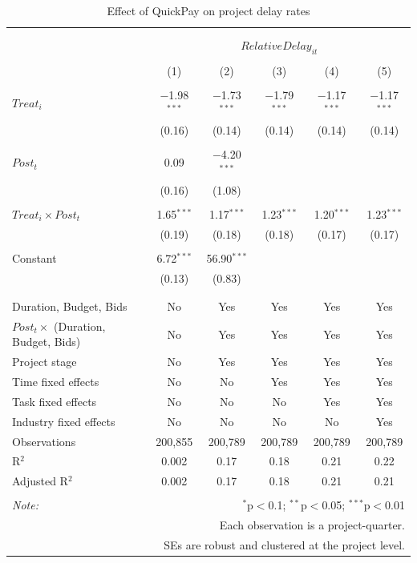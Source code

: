 \documentclass[
]{article}
\begin{document}
\begin{table}[H] \centering 
  \caption{Effect of QuickPay on project delay rates} 
  \label{} 
\small 
\begin{tabular}{@{\extracolsep{-2pt}}lccccc} 
\\[-1.8ex]\hline 
\hline \\[-1.8ex] 
\\[-1.8ex] & \multicolumn{5}{c}{$RelativeDelay_{it}$} \\ 
\\[-1.8ex] & (1) & (2) & (3) & (4) & (5)\\ 
\hline \\[-1.8ex] 
 $Treat_i$ & $-$1.98$^{***}$ & $-$1.73$^{***}$ & $-$1.79$^{***}$ & $-$1.17$^{***}$ & $-$1.17$^{***}$ \\ 
  & (0.16) & (0.14) & (0.14) & (0.14) & (0.14) \\ 
  & & & & & \\ 
 $Post_t$ & 0.09 & $-$4.20$^{***}$ &  &  &  \\ 
  & (0.16) & (1.08) &  &  &  \\ 
  & & & & & \\ 
 $Treat_i \times Post_t$ & 1.65$^{***}$ & 1.17$^{***}$ & 1.23$^{***}$ & 1.20$^{***}$ & 1.23$^{***}$ \\ 
  & (0.19) & (0.18) & (0.18) & (0.17) & (0.17) \\ 
  & & & & & \\ 
 Constant & 6.72$^{***}$ & 56.90$^{***}$ &  &  &  \\ 
  & (0.13) & (0.83) &  &  &  \\ 
  & & & & & \\ 
\hline \\[-1.8ex] 
Duration, Budget, Bids & No & Yes & Yes & Yes & Yes \\ 
$Post_t \times$  (Duration, Budget, Bids) & No & Yes & Yes & Yes & Yes \\ 
Project stage & No & Yes & Yes & Yes & Yes \\ 
Time fixed effects & No & No & Yes & Yes & Yes \\ 
Task fixed effects & No & No & No & Yes & Yes \\ 
Industry fixed effects & No & No & No & No & Yes \\ 
Observations & 200,855 & 200,789 & 200,789 & 200,789 & 200,789 \\ 
R$^{2}$ & 0.002 & 0.17 & 0.18 & 0.21 & 0.22 \\ 
Adjusted R$^{2}$ & 0.002 & 0.17 & 0.18 & 0.21 & 0.21 \\ 
\hline 
\hline \\[-1.8ex] 
\textit{Note:}  & \multicolumn{5}{r}{$^{*}$p$<$0.1; $^{**}$p$<$0.05; $^{***}$p$<$0.01} \\ 
 & \multicolumn{5}{r}{Each observation is a project-quarter.} \\ 
 & \multicolumn{5}{r}{SEs are robust and clustered at the project level.} \\ 
\end{tabular} 
\end{table}
\end{document}
